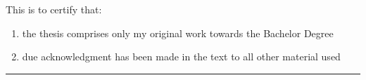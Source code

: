 \thispagestyle{empty}
This is to certify that:
\renewcommand{\labelenumi}{\roman{enumi}.}
\begin{enumerate}
\item the thesis comprises only my original work towards the Bachelor Degree
\item due acknowledgment has been made in the text to all other material used
\end{enumerate}
\renewcommand{\labelenumi}{\arabic{enumi}.}

\vspace{2cm}
\begin{flushright}
\rule[0mm]{6cm}{0.2mm}\\
\authorOfThesis\\
\submissionDate\\
\end{flushright}
